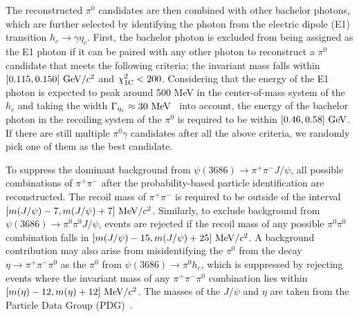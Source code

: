 \documentclass[twocolumn,showpacs,aps,prl]{revtex4-2}
\begin{document}
The reconstructed $\pi^0$ candidates are then combined with other bachelor photons, which are further selected by identifying the photon from the electric dipole (E1) transition $h_c \to \gamma \eta_c$. First, the bachelor photon is excluded from being assigned as the E1 photon if it can be paired with any other photon to reconstruct a $\pi^0$ candidate that meets the following criteria: the invariant mass falls within $[0.115,0.150]~{\rm GeV}/c^2$ and $\chi^2_{\rm 1C}<200$. Considering that the energy of the E1 photon is expected to peak around 500 MeV in the center-of-mass system of the $h_c$ and taking the width $\Gamma_{\eta_c} \approx 30~{\rm MeV}$~\cite{Colquhoun:2023zbc} into account, the energy of the bachelor photon in the recoiling system of the $\pi^0$ is required to be within $[0.46,0.58]~{\rm GeV}$. If there are still multiple $\pi^0 \gamma$ candidates after all the above criteria, we randomly pick one of them as the best candidate.

To suppress the dominant background from $\psi(3686) \to \pi^+ \pi^- J/\psi$, all possible combinations of $\pi^+ \pi^-$ after the probability-based particle identification are reconstructed. The recoil mass of $\pi^+\pi^-$ is required to be outside of the interval $[m(J/\psi)-7,m(J/\psi)+7]~{\rm MeV}/c^2$. Similarly, to exclude background from $\psi(3686) \to \pi^0 \pi^0 J/\psi$, events are rejected if the recoil mass of any possible $\pi^0 \pi^0$ combination falls in $[m(J/\psi)-15,m(J/\psi)+25]~{\rm MeV}/c^2$. A background contribution may also arise from misidentifying the $\pi^0$ from the decay $\eta \to \pi^+ \pi^- \pi^0$ as the $\pi^0$ from $\psi(3686) \to \pi^0 h_c$, which is suppressed by rejecting events where the invariant mass of any $\pi^+ \pi^- \pi^0$ combination lies within $[m(\eta)-12,m(\eta)+12]~{\rm MeV}/c^2$. The masses of the $J/\psi$ and $\eta$ are taken from the Particle Data Group (PDG)~\cite{ParticleDataGroup:2024cfk}.
\end{document}
